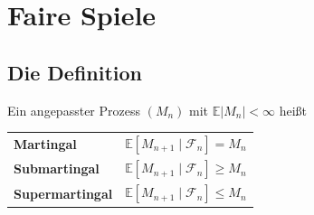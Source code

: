\chapter{Faire Spiele}

\section{Die Definition}

\begin{definition}
Ein angepasster Prozess $(M_n)$ mit $\mathbb{E}|M_n| < \infty$ heißt
\begin{center}
{\small
\renewcommand{\arraystretch}{1.5}
\begin{tabular}{@{}P{2.8cm}P{4.6cm}@{}}
\toprule
\textbf{Martingal} & $\mathbb{E}[M_{n+1} \mid \mathcal F_n] = M_n$\\
\textbf{Submartingal} & $\mathbb{E}[M_{n+1} \mid \mathcal F_n] \ge M_n$\\
\textbf{Supermartingal} & $\mathbb{E}[M_{n+1} \mid \mathcal F_n] \le M_n$\\
\bottomrule
\end{tabular}}
\end{center}
\end{definition}

